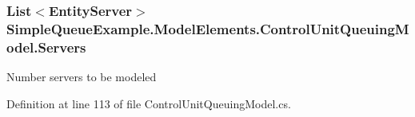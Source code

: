 \subsubsection[{\texorpdfstring{Servers}{Servers}}]{\setlength{\rightskip}{0pt plus 5cm}List$<${\bf Entity\+Server}$>$ Simple\+Queue\+Example.\+Model\+Elements.\+Control\+Unit\+Queuing\+Model.\+Servers\hspace{0.3cm}{\ttfamily [get]}}\hypertarget{class_simple_queue_example_1_1_model_elements_1_1_control_unit_queuing_model_a49ffeebb109f5d3b752479be15d1c1b7}{}\label{class_simple_queue_example_1_1_model_elements_1_1_control_unit_queuing_model_a49ffeebb109f5d3b752479be15d1c1b7}


Number servers to be modeled 



Definition at line 113 of file Control\+Unit\+Queuing\+Model.\+cs.

